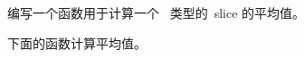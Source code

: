 \begin{Exercise}[title={平均值},difficulty=0]
\label{ex:average}
\Question\label{ex:average q1} 编写一个函数用于计算一个~ 类型的~slice 的平均值。
\end{Exercise}

\begin{Answer}
\Question 下面的函数计算平均值。

\showremarks
\end{Answer}
